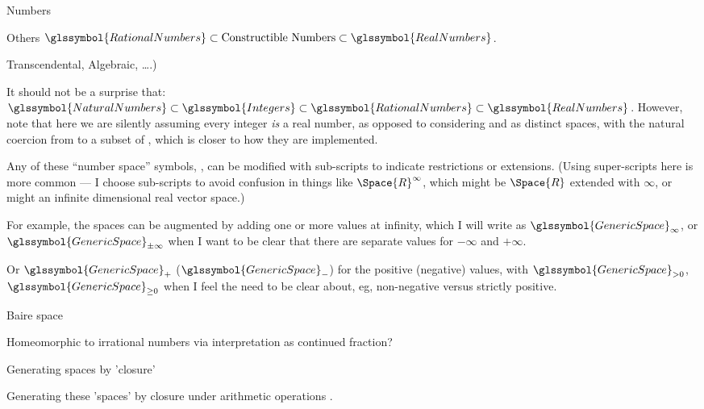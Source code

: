 \begin{plSection}{Numbers}
\begin{plSection}{Others}
$\glssymbol{RationalNumbers}
\subset 
\text{Constructible Numbers}
\subset 
\glssymbol{RealNumbers}$.

Transcendental, Algebraic, \ldots.)

It should not be a surprise that:
$\glssymbol{NaturalNumbers} 
\subset 
\glssymbol{Integers}
\subset 
\glssymbol{RationalNumbers}
\subset 
\glssymbol{RealNumbers}$.
However, note that here we are silently assuming every integer
\emph{is} a real number, as opposed to considering  and
 as distinct spaces, with the natural coercion
from  to a subset of ,
which is closer to how they are implemented.

Any of these ``number space'' symbols, ,
can be modified with sub-scripts to indicate restrictions or
extensions. 
(Using super-scripts here is more common --- I choose sub-scripts
to avoid confusion in things like $\Space{R}^{\infty}$,
which might be $\Space{R}$ extended with ${\infty}$, 
or might an infinite dimensional real vector space.)

For example, the spaces can be 
augmented by adding one or more values at infinity, which I will
write as $\glssymbol{GenericSpace}_{\infty}$,
or $\glssymbol{GenericSpace}_{\pm\infty}$ when I want to be 
clear that there are separate values for $-\infty$ and $+\infty$.

Or $\glssymbol{GenericSpace}_{+}$ ($\glssymbol{GenericSpace}_{-}$)
for the positive (negative) values, with 
$\glssymbol{GenericSpace}_{> 0}$, $\glssymbol{GenericSpace}_{\geq 0}$ 
when I feel the need to be clear about, eg, non-negative versus
strictly positive.

\end{plSection}%
\begin{plSection}{Baire space}
\label{sec:Baire-space}

Homeomorphic to irrational numbers
via interpretation as 
continued 
fraction?\cite{wiki:BaireSpaceSetTheory,
wiki:BaireCategoryTheorem,wiki:BaireSpace}

\end{plSection}%
\begin{plSection}{Generating spaces by 'closure'}

Generating these 'spaces' by closure under arithmetic operations
\cite{PickertGorke:1974:RealNumbers}.


\end{plSection}
\end{plSection}
